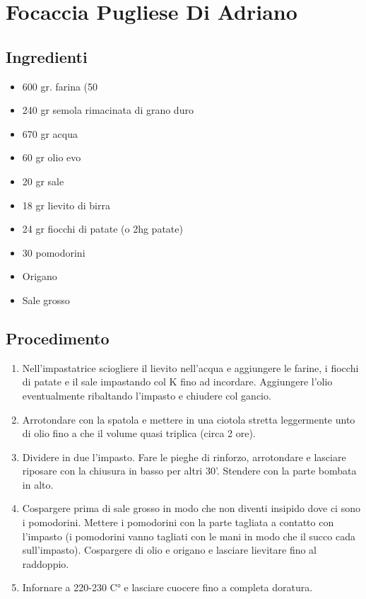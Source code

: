 \section{Focaccia Pugliese Di Adriano}
\subsection{Ingredienti}
\begin{itemize}
\item 600 gr. farina (50%
\item 240 gr semola rimacinata di grano duro  
\item 670 gr acqua  
\item 60 gr olio evo  
\item 20 gr sale  
\item 18 gr lievito di birra  
\item 24 gr fiocchi di patate (o 2hg patate)  
\item 30 pomodorini  
\item Origano  
\item Sale grosso
\end{itemize}
\subsection{Procedimento}
\begin{enumerate}
\item  Nell'impastatrice sciogliere il lievito nell'acqua e aggiungere le farine, i fiocchi di patate e il sale impastando col K fino ad incordare. Aggiungere l'olio eventualmente ribaltando l'impasto e chiudere col gancio.  
\item  Arrotondare con la spatola e mettere in una ciotola stretta leggermente unto di olio fino a che il volume quasi triplica (circa 2 ore).  
\item  Dividere in due l'impasto. Fare le pieghe di rinforzo, arrotondare e lasciare riposare con la chiusura in basso per altri 30'. Stendere con la parte bombata in alto.   
\item  Cospargere prima di sale grosso in modo che non diventi insipido dove ci sono i pomodorini. Mettere i pomodorini con la parte tagliata a contatto con l'impasto (i pomodorini vanno tagliati con le mani in modo che il succo cada sull'impasto). Cospargere di olio e origano e lasciare lievitare fino al raddoppio.  
\item  Infornare a 220-230 C° e lasciare cuocere fino a completa doratura.
\end{enumerate}
